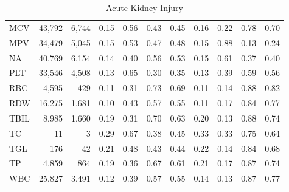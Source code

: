 \begin{table}[ht]
\begin{tabular}{lrrrrrrrrrr}
MCV & 43,792 & 6,744 & 0.15 & 0.56 & 0.43 & 0.45 & 0.16 & 0.22 & 0.78 & 0.70 \\
MPV & 34,479 & 5,045 & 0.15 & 0.53 & 0.47 & 0.48 & 0.15 & 0.88 & 0.13 & 0.24 \\
NA & 40,769 & 6,154 & 0.14 & 0.40 & 0.56 & 0.53 & 0.15 & 0.61 & 0.37 & 0.40 \\
PLT & 33,546 & 4,508 & 0.13 & 0.65 & 0.30 & 0.35 & 0.13 & 0.39 & 0.59 & 0.56 \\
RBC & 4,595 & 429 & 0.11 & 0.31 & 0.73 & 0.69 & 0.11 & 0.14 & 0.88 & 0.82 \\
RDW & 16,275 & 1,681 & 0.10 & 0.43 & 0.57 & 0.55 & 0.11 & 0.17 & 0.84 & 0.77 \\
TBIL & 8,985 & 1,660 & 0.19 & 0.31 & 0.70 & 0.63 & 0.20 & 0.13 & 0.88 & 0.74 \\
TC & 11 & 3 & 0.29 & 0.67 & 0.38 & 0.45 & 0.33 & 0.33 & 0.75 & 0.64 \\
TGL & 176 & 42 & 0.21 & 0.48 & 0.43 & 0.44 & 0.22 & 0.14 & 0.84 & 0.68 \\
TP & 4,859 & 864 & 0.19 & 0.36 & 0.67 & 0.61 & 0.21 & 0.17 & 0.87 & 0.74 \\
WBC & 25,827 & 3,491 & 0.12 & 0.39 & 0.57 & 0.55 & 0.14 & 0.13 & 0.87 & 0.77 \\
\bottomrule
\end{tabular}
\caption{Acute Kidney Injury}
\end{table}